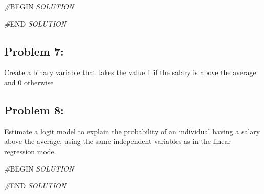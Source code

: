 \documentclass[
]{article}
\newenvironment{Shaded}{\begin{snugshade}}{\end{snugshade}}
\newcommand{\AttributeTok}[1]{\textcolor[rgb]{0.13,0.29,0.53}{#1}}
\newcommand{\CommentTok}[1]{\textcolor[rgb]{0.56,0.35,0.01}{\textit{#1}}}
\newcommand{\DecValTok}[1]{\textcolor[rgb]{0.00,0.00,0.81}{#1}}
\newcommand{\FunctionTok}[1]{\textcolor[rgb]{0.13,0.29,0.53}{\textbf{#1}}}
\newcommand{\NormalTok}[1]{#1}
\newcommand{\OtherTok}[1]{\textcolor[rgb]{0.56,0.35,0.01}{#1}}
\newcommand{\RegionMarkerTok}[1]{#1}
\newcommand{\SpecialCharTok}[1]{\textcolor[rgb]{0.81,0.36,0.00}{\textbf{#1}}}
\begin{document}
\begin{Shaded}
\begin{Highlighting}[]
\CommentTok{\#}\RegionMarkerTok{BEGIN}\CommentTok{ SOLUTION}

\CommentTok{\#}\RegionMarkerTok{END}\CommentTok{ SOLUTION}
\end{Highlighting}
\end{Shaded}

\hypertarget{problem-7}{%
\subsection{Problem 7:}\label{problem-7}}

Create a binary variable that takes the value 1 if the salary is above
the average and 0 otherwise

\begin{Shaded}
\end{Shaded}

\hypertarget{problem-8}{%
\subsection{Problem 8:}\label{problem-8}}

Estimate a logit model to explain the probability of an individual
having a salary above the average, using the same independent variables
as in the linear regression mode.

\begin{Shaded}
\begin{Highlighting}[]
\CommentTok{\#}\RegionMarkerTok{BEGIN}\CommentTok{ SOLUTION}

\CommentTok{\#}\RegionMarkerTok{END}\CommentTok{ SOLUTION}
\end{Highlighting}
\end{Shaded}
\end{document}
